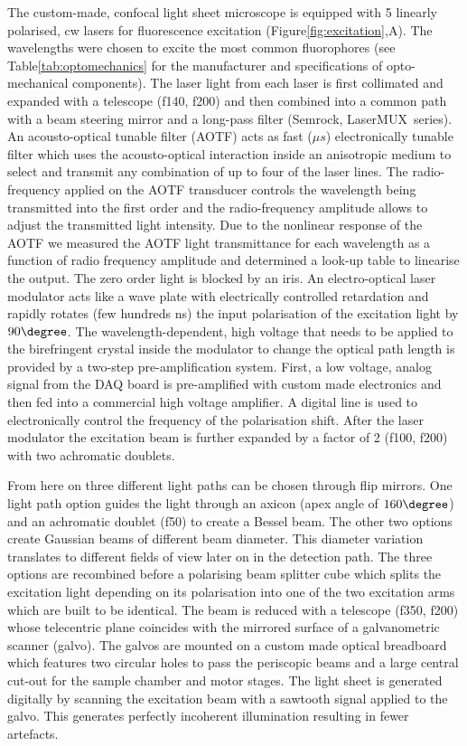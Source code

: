 \documentclass[12pt]{spieman}  %
\begin{document}
The custom-made, confocal light sheet microscope is equipped with 5 linearly polarised, cw lasers for fluorescence excitation (Figure\ref{fig:excitation},A). The wavelengths were chosen to excite the most common fluorophores (see Table\ref{tab:optomechanics} for the manufacturer and specifications of opto-mechanical components). The laser light from each laser is first collimated and expanded with a telescope (f140, f200) and then combined into a common path with a beam steering mirror and a long-pass filter (Semrock, LaserMUX\texttrademark\ series). An acousto-optical tunable filter (AOTF) acts as fast ($\mu s$) electronically tunable filter which uses the acousto-optical interaction inside an anisotropic medium to select and transmit any combination of up to four of the laser lines. The radio-frequency applied on the AOTF transducer controls the wavelength being transmitted into the first order and the radio-frequency amplitude allows to adjust the transmitted light intensity. Due to the nonlinear response of the AOTF we measured the AOTF light transmittance for each wavelength as a function of radio frequency amplitude and determined a look-up table to linearise the output. The zero order light is blocked by an iris. An electro-optical laser modulator acts like a wave plate with electrically controlled retardation and rapidly rotates (few hundreds ns) the input polarisation of the excitation light by $90\degree$. The wavelength-dependent, high voltage that needs to be applied to the birefringent crystal inside the modulator to change the optical path length is provided by a two-step pre-amplification system. First, a low voltage, analog signal from the DAQ board is pre-amplified with custom made electronics and then fed into a commercial high voltage amplifier. A digital line is used to electronically control the frequency of the polarisation shift. After the laser modulator the excitation beam is further expanded by a factor of 2 (f100, f200) with two achromatic doublets. 

From here on three different light paths can be chosen through flip mirrors. One light path option guides the light through an axicon (apex angle of $160\degree$) and an achromatic doublet (f50) to create a Bessel beam. The other two options create Gaussian beams of different beam diameter. This diameter variation translates to different fields of view later on in the detection path. The three options are recombined before a polarising beam splitter cube which splits the excitation light depending on its polarisation into one of the two excitation arms which are built to be identical. The beam is reduced with a telescope (f350, f200) whose telecentric plane coincides with the mirrored surface of a galvanometric scanner (galvo). The galvos are mounted on a custom made optical breadboard which features two circular holes to pass the periscopic beams and a large central cut-out for the sample chamber and motor stages. The light sheet is generated digitally by scanning the excitation beam with a sawtooth signal applied to the galvo. This generates perfectly incoherent illumination resulting in fewer artefacts.%
\end{document}
